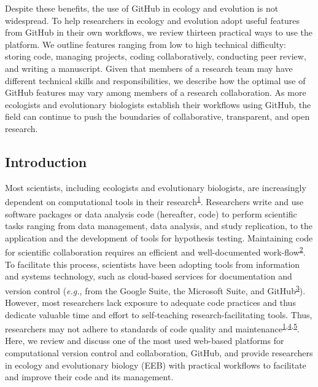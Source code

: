 Despite these benefits, the use of GitHub in ecology and evolution is not widespread.
To help researchers in ecology and evolution adopt useful features from GitHub in their own workflows, we review thirteen practical ways to use the platform.
We outline features ranging from low to high technical difficulty: storing code, managing projects, coding collaboratively, conducting peer review, and writing a manuscript.
Given that members of a research team may have different technical skills and responsibilities, we describe how the optimal use of GitHub features may vary among members of a research collaboration.
As more ecologists and evolutionary biologists establish their workflows using GitHub, the field can continue to push the boundaries of collaborative, transparent, and open research.

\hypertarget{introduction}{%
\subsection{Introduction}\label{introduction}}

Most scientists, including ecologists and evolutionary biologists, are increasingly dependent on computational tools in their research\textsuperscript{\protect\hyperlink{ref-fJWFe93e}{1}}.
Researchers write and use software packages or data analysis code (hereafter, code) to perform scientific tasks ranging from data management, data analysis, and study replication, to the application and the development of tools for hypothesis testing.
Maintaining code for scientific collaboration requires an efficient and well-documented work-flow\textsuperscript{\protect\hyperlink{ref-1Kqna6l2}{2}}.
To facilitate this process, scientists have been adopting tools from information and systems technology, such as cloud-based services for documentation and version control (\emph{e.g.}, from the Google Suite, the Microsoft Suite, and GitHub\textsuperscript{\protect\hyperlink{ref-10ghgV3S8}{3}}).
However, most researchers lack exposure to adequate code practices and thus dedicate valuable time and effort to self-teaching research-facilitating tools.
Thus, researchers may not adhere to standards of code quality and maintenance\textsuperscript{\protect\hyperlink{ref-fJWFe93e}{1},\protect\hyperlink{ref-10SpoByIw}{4},\protect\hyperlink{ref-O6UbstGG}{5}}.
Here, we review and discuss one of the most used web-based platforms for computational version control and collaboration, GitHub, and provide researchers in ecology and evolutionary biology (EEB) with practical workflows to facilitate and improve their code and its management.

